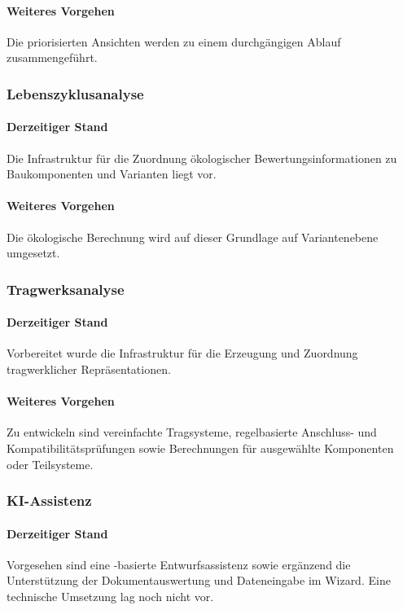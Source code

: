 \documentclass[type=zwischenbericht]{zukunftbau}
\begin{document}
\paragraph{Weiteres Vorgehen}
Die priorisierten Ansichten werden zu einem durchgängigen Ablauf zusammengeführt.

\subsubsection{Lebenszyklusanalyse}

\paragraph{Derzeitiger Stand}
Die Infrastruktur für die Zuordnung ökologischer Bewertungsinformationen zu Baukomponenten und Varianten liegt vor.

\paragraph{Weiteres Vorgehen}
Die ökologische Berechnung wird auf dieser Grundlage auf Variantenebene umgesetzt.

\subsubsection{Tragwerksanalyse}

\paragraph{Derzeitiger Stand}
Vorbereitet wurde die Infrastruktur für die Erzeugung und Zuordnung tragwerklicher Repräsentationen.

\paragraph{Weiteres Vorgehen}
Zu entwickeln sind vereinfachte Tragsysteme, regelbasierte Anschluss- und Kompatibilitätsprüfungen sowie Berechnungen für ausgewählte Komponenten oder Teilsysteme.

\subsubsection{KI-Assistenz}

\paragraph{Derzeitiger Stand}
Vorgesehen sind eine -basierte Entwurfsassistenz sowie ergänzend die Unterstützung der Dokumentauswertung und Dateneingabe im Wizard. Eine technische Umsetzung lag noch nicht vor.
\end{document}
